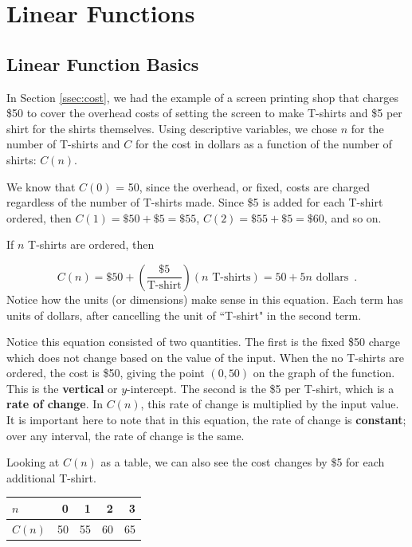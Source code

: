 \section{Linear Functions}
\label{sec:linear}


\subsection{Linear Function Basics}

In Section \ref{ssec:cost}, we had the example of a screen printing shop that charges \$50 to cover the overhead costs of setting the screen to make T-shirts and \$5 per shirt for the shirts themselves. Using descriptive variables, we chose $n$ for the number of T-shirts and $C$ for the cost in dollars as a function of the number of shirts: $C(n)$.

We know that $C(0)$ = 50, since the overhead, or fixed, costs are charged regardless of the number of T-shirts made. Since \$5 is added for each T-shirt ordered, then $C(1) = \$50 + \$5 = \$55$, $C(2) = \$55 + \$5 = \$60$, and so on.

If $n$ T-shirts are ordered, then

$$C(n) = \$50 + \left(\frac{\$5}{\mbox{T-shirt}}\right)(n \mbox{ T-shirts}) = 50 + 5n \mbox{ dollars} \enspace .$$
Notice how the units (or dimensions) make sense in this equation. Each term has units of dollars, after cancelling the unit of ``T-shirt" in the second term.

Notice this equation consisted of two quantities. The first is the fixed \$50 charge which does not change based on the value of the input. When the no T-shirts are ordered, the cost is \$50, giving the point
$(0, 50)$ on the graph of the function. This is the {\bf vertical} or {$y$-intercept}. The second is the \$5 per T-shirt, which is a \textbf{rate of change}. In $C(n)$, this rate of change is multiplied by the input value. It is important here to note that in this equation, the rate of change is {\bf constant}; over any interval, the rate of change is the same.

Looking at $C(n)$ as a table, we can also see the cost changes by \$5 for each additional T-shirt.

\begin{table}[!ht]
\centering
\begin{tabular}{lrrrr}
\toprule
$n$    &  0 &  1 &  2 &  3 \\%
\midrule
$C(n)$ & 50 & 55 & 60 & 65 \\%
\bottomrule
\end{tabular}
\end{table}

